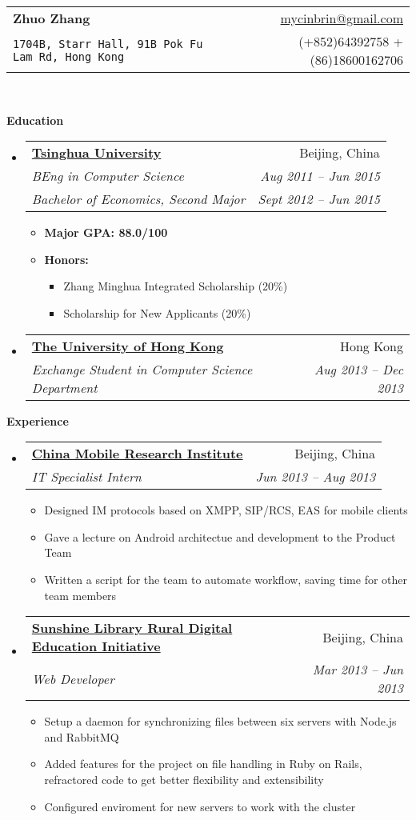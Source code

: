 \documentclass[letterpaper,11pt]{article}
\makeatletter
\newcommand{\resitem}[1]{\item #1 \vspace{-2pt}}
\newcommand{\resheading}[1]{{\large \colorbox{mygrey}{\begin{minipage}{\textwidth}{\textbf{#1 \vphantom{p\^{E}}}}\end{minipage}}}}
\newcommand{\ressubheading}[4]{
\begin{tabular*}{6.5in}{l@{\extracolsep{\fill}}r}
		\textbf{#1} & #2 \\
		\textit{#3} & \textit{#4} \\
\end{tabular*}\vspace{-6pt}}
\newcommand{\ressubheadingg}[6]{
\begin{tabular*}{6.5in}{l@{\extracolsep{\fill}}r}
		\textbf{#1} & #2 \\
		\textit{#3} & \textit{#4} \\
		\textit{#5} & \textit{#6} \\
\end{tabular*}\vspace{-6pt}}
\makeatother
\begin{document}
\newcommand{\mywebheader}{
\begin{tabular*}{7in}{l@{\extracolsep{\fill}}r}
	\textbf{{\LARGE Zhuo Zhang}} & \href{mailto:mycinbrin@gmail.com}{mycinbrin@gmail.com}\\
	{\footnotesize \texttt{1704B, Starr Hall, 91B Pok Fu Lam Rd, Hong Kong}} & {(+852)64392758 +(86)18600162706}
	\end{tabular*}
\\
\vspace{0.1in}}

\mywebheader

\resheading{Education}
	\begin{itemize}
			\item
				\ressubheadingg{\href{http://www.tsinghua.edu.cn}{Tsinghua University}}{Beijing, China}{{BEng in Computer Science}}{Aug 2011 -- Jun 2015}{Bachelor of Economics, Second Major}{Sept 2012 -- Jun 2015}
				{ \footnotesize
				\begin{itemize}
						\resitem{\textbf{Major GPA: 88.0/100}}
						\resitem{\textbf{Honors:}} 
						\begin{itemize}
								\resitem{Zhang Minghua Integrated Scholarship (20\%) }
								\resitem{Scholarship for New Applicants (20\%) }
						\end{itemize}
				\end{itemize}
				}
			\item
				\ressubheading{\href{http://www.hku.hku}{The University of Hong Kong}}{Hong Kong}{Exchange Student in Computer Science Department}{Aug 2013 -- Dec 2013}{}
	\end{itemize} %

\resheading{Experience}
	\begin{itemize}
		\item 
			\ressubheading{\href{http://labs.chinamobile.com/}{China Mobile Research Institute}}{Beijing, China}
				{IT Specialist Intern}{Jun 2013 -- Aug 2013}
				{ \footnotesize
				\begin{itemize}

						\resitem{Designed IM protocols based on XMPP, SIP/RCS, EAS for mobile clients}
						\resitem{Gave a lecture on Android architectue and development to the Product Team}
						\resitem{Written a script for the team to automate workflow, saving time for other team members}
				\end{itemize}
				}
		\item 
			\ressubheading{\href{http://www.sunshine-library.org}{Sunshine Library Rural Digital Education Initiative}}{Beijing, China}{Web Developer}{Mar 2013 -- Jun 2013}
				{ \footnotesize
				\begin{itemize}
						\resitem{Setup a daemon for synchronizing files between six servers with Node.js and RabbitMQ}
						\resitem{Added features for the project on file handling in Ruby on Rails, refractored code to get better flexibility and extensibility}
						\resitem{Configured enviroment for new servers to work with the cluster}
				\end{itemize}
				}
	\end{itemize}  %
\end{document}

